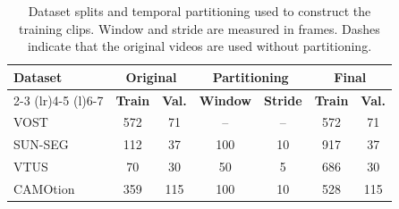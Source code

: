 \begin{table}[!h]
\caption{Dataset splits and temporal partitioning used to construct the
training clips. Window and stride are measured in frames. Dashes indicate
that the original videos are used without partitioning.}
\label{tab:app_dataset_statistics}

\centering
\setlength{\tabcolsep}{2.2pt}
{\small
\begin{tabular}{@{}lcccccc@{}}
\toprule
\textbf{Dataset}
&
\multicolumn{2}{c}{\textbf{Original}}
&
\multicolumn{2}{c}{\textbf{Partitioning}}
&
\multicolumn{2}{c}{\textbf{Final}}
\\
\cmidrule(lr){2-3}
\cmidrule(lr){4-5}
\cmidrule(l){6-7}
&
\textbf{Train}
&
\textbf{Val.}
&
\textbf{Window}
&
\textbf{Stride}
&
\textbf{Train}
&
\textbf{Val.}
\\
\midrule
VOST
& 572 & 71
& -- & --
& 572 & 71
\\
SUN-SEG
& 112 & 37
& 100 & 10
& 917 & 37
\\
VTUS
& 70 & 30
& 50 & 5
& 686 & 30
\\
CAMOtion
& 359 & 115
& 100 & 10
& 528 & 115
\\
\bottomrule
\end{tabular}
}

\end{table}
